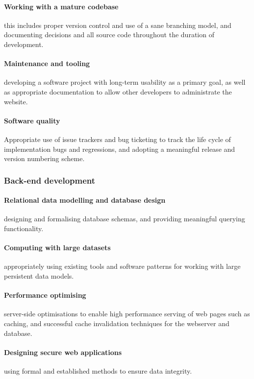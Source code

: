 \documentclass[12pt,a4paper]{article}
\begin{document}
\paragraph{Working with a mature codebase} this includes proper version control
and use of a sane branching model, and documenting decisions and all source code
throughout the duration of development.

\paragraph{Maintenance and tooling} developing a software project with long-term
usability as a primary goal, as well as appropriate documentation to allow other
developers to administrate the website.

\paragraph{Software quality} Appropriate use of issue trackers and bug ticketing
to track the life cycle of implementation bugs and regressions, and adopting a
meaningful release and version numbering scheme.

\subsubsection{Back-end development}

\paragraph{Relational data modelling and database design} designing and
formalising database schemas, and providing meaningful querying functionality.

\paragraph{Computing with large datasets} appropriately using existing tools and
software patterns for working with large persistent data models.

\paragraph{Performance optimising} server-side optimisations to enable high
performance serving of web pages such as caching, and successful cache
invalidation techniques for the webserver and database.

\paragraph{Designing secure web applications} using formal and established
methods to ensure data integrity.
\end{document}
